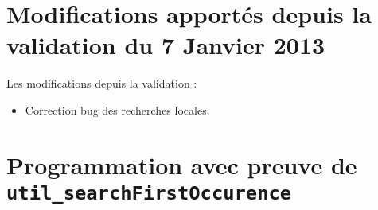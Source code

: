 \documentclass[a4paper, 11pt]{article}
\begin{document}
	\section{Modifications apportés depuis la validation du 7 Janvier 2013}
	Les modifications depuis la validation : 
	\begin{itemize}
		\item Correction bug des recherches locales.
	\end{itemize}
	\section{Programmation avec preuve de \texttt{util\_searchFirstOccurence}}
\end{document}
